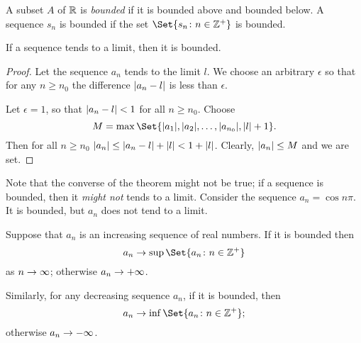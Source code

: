 \documentclass[main.tex]{subfiles}
\begin{document}
	\begin{definition}
		A subset $A$ of $\mathbb R$ is \textit{bounded} if it is bounded above and bounded below. A sequence $s_n$ is bounded if the set $\Set{s_n \colon n \in \ZZ^+}$ is bounded.
	\end{definition}
	\begin{theorem}
		If a sequence tends to a limit, then it is bounded.
	\end{theorem}
	\begin{proof}
		Let the sequence $a_n$ tends to the limit $l$. We choose an arbitrary $\epsilon$ so that for any $n \geq n_0$ the difference $\lvert a_n - l\rvert$ is less than $\epsilon$. 
		
		Let $\epsilon = 1$, so that $\lvert a_n - l\rvert < 1$ for all $n \geq n_0$. Choose
		\begin{equation*}
		M = \max\Set{\abs {a_1} , \abs {a_2}, \ldots, \abs {a_{n_0}}, \abs{l} + 1}.
		\end{equation*}
		Then for all $n \geq n_0$ $\lvert a_{n}\rvert \leq \lvert a_{n} - l\rvert + \lvert l\rvert < 1 + \lvert l\rvert$. Clearly, $\lvert a_n\rvert \leq M$ and we are set.
	\end{proof}

	Note that the converse of the theorem might not be true; if a sequence is bounded, then it \textit{might not} tends to a limit. Consider the sequence $a_n = \cos n\pi$. It is bounded, but $a_n$ does not tend to a limit.
	
	\begin{theorem}
		Suppose that $a_n$ is an increasing sequence of real numbers. If it is bounded then 
		\begin{equation*}
			a_n \ra \sup\Set{a_n \colon n \in \ZZ^+}
		\end{equation*}
		as $n \rightarrow \infty$; otherwise $a_n \rightarrow +\infty$.
		
		Similarly, for any decreasing sequence $a_n$, if it is bounded, then 
		\begin{equation*}
			a_n \ra {\inf\Set{a_n \colon n \in \ZZ^+}};
		\end{equation*} otherwise $a_n \rightarrow -\infty$.
	\end{theorem}
	
\end{document}
